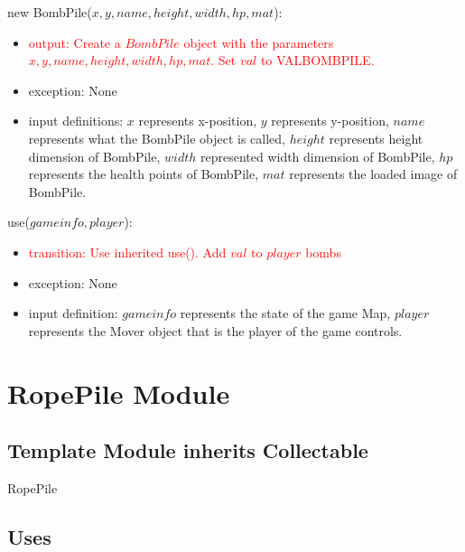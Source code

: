 \documentclass[12pt]{article}
\newcommand{\m}[1]{\mbox{#1}}
\begin{document}
new BombPile($x, y, name, height, width, hp, mat$):
\begin{itemize}
    \item \textcolor{red}{output: Create a $BombPile$ object with the parameters $x, y, name, height, width, hp, mat$. Set $val$ to VALBOMBPILE.}
    \item exception: None
    \item input definitions: $x$ represents x-position, $y$ represents y-position, $name$ represents what the BombPile object is called, $height$ represents height dimension of BombPile, $width$ represented width dimension of BombPile, $hp$ represents the health points of BombPile, $mat$ represents the loaded image of BombPile.
\end{itemize}

\noindent use($gameinfo, player$):
\begin{itemize}
    \item \textcolor{red}{transition: Use inherited use(). Add $val$ to $player$ bombs}
    \item exception: None
    \item input definition: $gameinfo$ represents the state of the game Map, $player$ represents the Mover object that is the player of the game controls.
\end{itemize}

\newpage

\section*{RopePile Module}

\subsection*{Template Module inherits Collectable}

RopePile

\subsection*{Uses}
\end{document}
